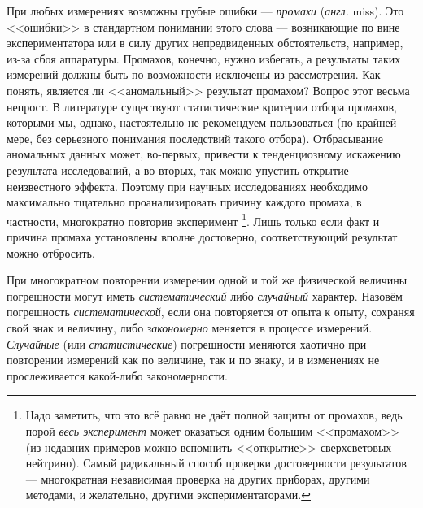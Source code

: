 При любых измерениях возможны грубые ошибки --- \emph{промахи}
(\emph{англ.} miss). Это <<ошибки>> в стандартном
понимании этого слова --- возникающие по вине экспериментатора
или в силу других непредвиденных обстоятельств, например, из-за сбоя
аппаратуры. Промахов, конечно, нужно избегать, а результаты таких
измерений должны быть по возможности исключены из рассмотрения. Как
понять, является ли <<аномальный>> результат
промахом? Вопрос этот весьма непрост. В литературе существуют статистические
критерии отбора промахов, которыми мы, однако, настоятельно не рекомендуем
пользоваться (по крайней мере, без серьезного понимания последствий
такого отбора). Отбрасывание аномальных данных может, во-первых, привести
к тенденциозному искажению результата исследований, а во-вторых, так
можно упустить открытие неизвестного эффекта. Поэтому при научных
исследованиях необходимо максимально тщательно проанализировать причину
каждого промаха, в частности, многократно повторив эксперимент \footnote{Надо
заметить, что это всё равно не даёт полной защиты от промахов,
ведь порой \emph{весь эксперимент} может оказаться одним большим <<промахом>>
(из недавних примеров можно вспомнить <<открытие>>
сверхсветовых нейтрино). Самый радикальный способ проверки достоверности
результатов --- многократная независимая проверка на других
приборах, другими методами, и желательно, другими экспериментаторами.}. Лишь
только если факт и причина промаха установлены вполне достоверно,
соответствующий результат можно отбросить.


При многократном повторении измерении одной и той же физической величины
погрешности могут иметь \emph{систематический} либо \emph{случайный}
характер. Назовём погрешность \emph{систематической}, если она повторяется
от опыта к опыту, сохраняя свой знак и величину, либо \emph{закономерно}
меняется в процессе измерений. \emph{Случайные} (или \emph{статистические})
погрешности меняются хаотично при повторении измерений как по величине,
так и по знаку, и в изменениях не прослеживается какой-либо закономерности.

